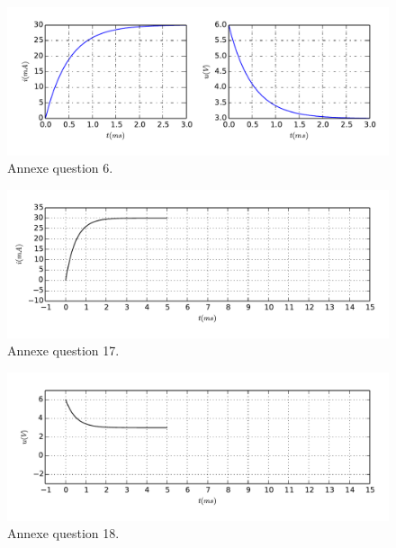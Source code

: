 \documentclass[a4paper, 10pt, garamond, oneside]{book}
\begin{document}
{	\begin{figure}[htbp!]
		\centering
		\includegraphics[width=\linewidth]{transRL_trace.pdf}
    \vspace{-40pt}
		\caption{Annexe question 6.}
		\label{fig:annexe_p2-1}
	\end{figure}
	\begin{figure}[htbp!]
		\centering
		\includegraphics[width=\linewidth]{transRL_tracei.pdf}
    \vspace{-40pt}
		\caption{Annexe question 17.}
		\label{fig:annexe_p2-2}
	\end{figure}
	\begin{figure}[htbp!]
		\centering
		\includegraphics[width=\linewidth]{transRL_traceu.pdf}
    \vspace{-40pt}
		\caption{Annexe question 18.}
		\label{fig:annexe_p2-3}
	\end{figure}

}{
	\newpage
}
\end{document}
